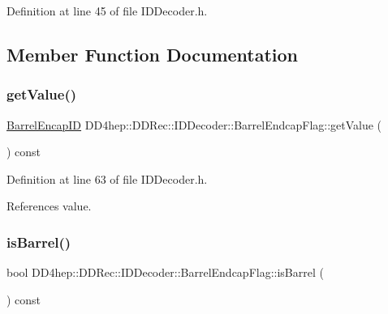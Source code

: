 Definition at line 45 of file I\+D\+Decoder.\+h.



\subsection{Member Function Documentation}
\hypertarget{class_d_d4hep_1_1_d_d_rec_1_1_i_d_decoder_1_1_barrel_endcap_flag_a47ba8b3abe179806cc641103b42b19c4}{}\label{class_d_d4hep_1_1_d_d_rec_1_1_i_d_decoder_1_1_barrel_endcap_flag_a47ba8b3abe179806cc641103b42b19c4} 
\subsubsection{\texorpdfstring{get\+Value()}{getValue()}}
{\footnotesize\ttfamily \hyperlink{class_d_d4hep_1_1_d_d_rec_1_1_i_d_decoder_1_1_barrel_endcap_flag_acbdae4d36c49605ada531eddce7b60d8}{Barrel\+Encap\+ID} D\+D4hep\+::\+D\+D\+Rec\+::\+I\+D\+Decoder\+::\+Barrel\+Endcap\+Flag\+::get\+Value (\begin{DoxyParamCaption}{ }\end{DoxyParamCaption}) const\hspace{0.3cm}{\ttfamily [inline]}}



Definition at line 63 of file I\+D\+Decoder.\+h.



References value.

\hypertarget{class_d_d4hep_1_1_d_d_rec_1_1_i_d_decoder_1_1_barrel_endcap_flag_a921c03e4bba6fc0bbbf6eb80a1216746}{}\label{class_d_d4hep_1_1_d_d_rec_1_1_i_d_decoder_1_1_barrel_endcap_flag_a921c03e4bba6fc0bbbf6eb80a1216746} 
\subsubsection{\texorpdfstring{is\+Barrel()}{isBarrel()}}
{\footnotesize\ttfamily bool D\+D4hep\+::\+D\+D\+Rec\+::\+I\+D\+Decoder\+::\+Barrel\+Endcap\+Flag\+::is\+Barrel (\begin{DoxyParamCaption}{ }\end{DoxyParamCaption}) const\hspace{0.3cm}{\ttfamily [inline]}}



